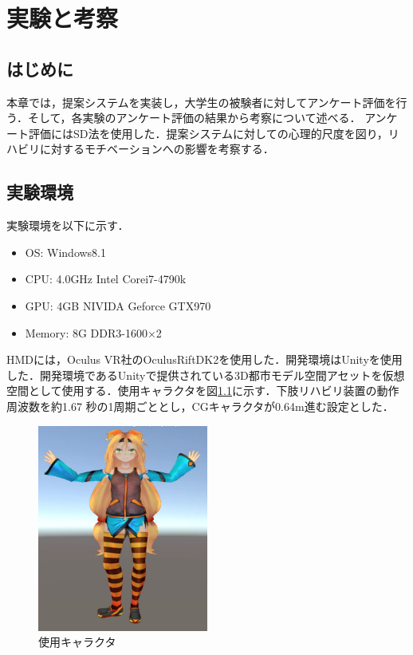 \chapter{実験と考察}
\thispagestyle{myheadings}

\section{はじめに}
本章では，提案システムを実装し，大学生の被験者に対してアンケート評価を行う．そして，各実験のアンケート評価の結果から考察について述べる．
アンケート評価にはSD法を使用した．提案システムに対しての心理的尺度を図り，リハビリに対するモチベーションへの影響を考察する．
\section{実験環境}
実験環境を以下に示す．

\begin{itemize}
 \item OS: Windows8.1
 \item CPU: 4.0GHz Intel Corei7-4790k
 \item GPU: 4GB NIVIDA Geforce GTX970
 \item Memory: 8G DDR3-1600×2
\end{itemize}

HMDには，Oculus VR社のOculusRiftDK2\cite{OculusRift}を使用した．開発環境はUnity\cite{Unity}を使用した．開発環境であるUnityで提供されている3D都市モデル空間アセット\cite{3D都市モデル}を仮想空間として使用する．使用キャラクタを図\ref{fig:chara}に示す．下肢リハビリ装置の動作周波数を約1.67 秒の1周期ごととし，CGキャラクタが0.64m進む設定とした．

\begin{figure}[tbp]
	\centering
			\includegraphics[width=0.5\textwidth]{chap3-figure/UntyChan.eps}
	\caption{使用キャラクタ\protect \footnotemark}
	\label{fig:chara}
\end{figure}

